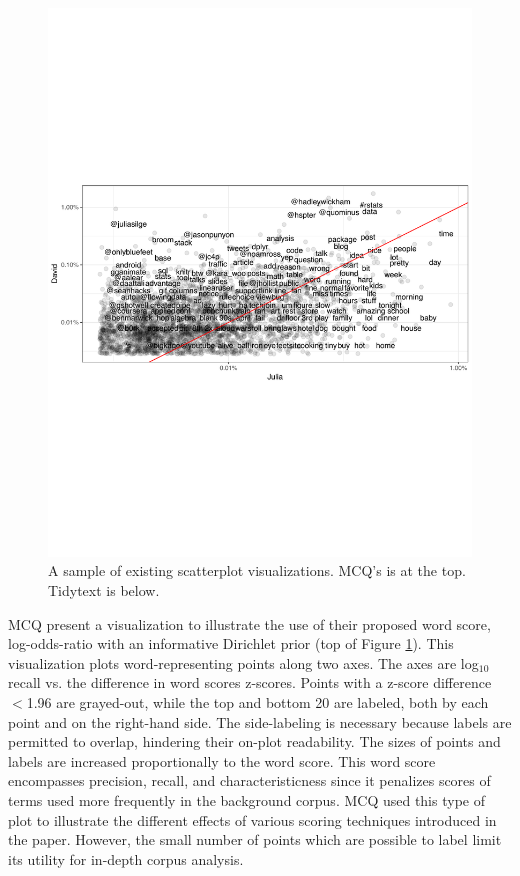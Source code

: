 \documentclass[11pt,a4paper]{article}
\begin{document}
\begin{figure}[h]
\includegraphics[width=\columnwidth]{tidytext}
\caption{A sample of existing scatterplot visualizations. MCQ's is at the top. Tidytext is below.} 
\label{scatters}
\end{figure}
\vspace{-3mm}
MCQ present a visualization to illustrate the use of their proposed word score, log-odds-ratio with an informative Dirichlet prior (top of Figure \ref{scatters}).  This visualization plots word-representing points along two axes.  The axes are log$_{10}$ recall vs. the difference in word scores z-scores.  Points with a z-score difference $<$1.96 are grayed-out, while the top and bottom 20 are labeled, both by each point and on the right-hand side.  The side-labeling is necessary because labels are permitted to overlap, hindering their on-plot readability.  The sizes of points and labels are increased proportionally to the word score. This word score encompasses precision, recall, and characteristicness since it penalizes scores of terms used more frequently in the background corpus. MCQ used this type of plot to illustrate the different effects of various scoring techniques introduced in the paper.  However, the small number of points which are possible to label limit its utility for in-depth corpus analysis.  
\end{document}
